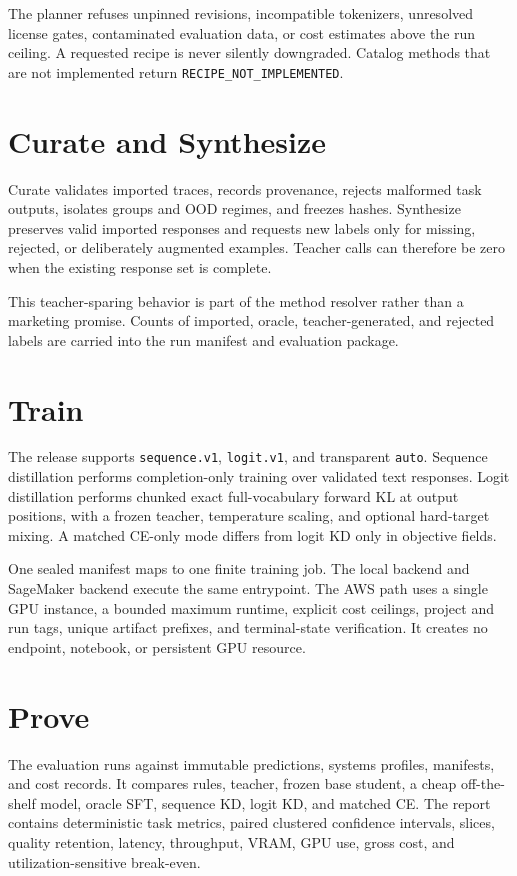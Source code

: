 \documentclass{article}
\begin{document}
The planner refuses unpinned revisions, incompatible tokenizers, unresolved license gates, contaminated evaluation data, or cost estimates above the run ceiling. A requested recipe is never silently downgraded. Catalog methods that are not implemented return \texttt{RECIPE\_NOT\_IMPLEMENTED}.

\section{Curate and Synthesize}
Curate validates imported traces, records provenance, rejects malformed task outputs, isolates groups and OOD regimes, and freezes hashes. Synthesize preserves valid imported responses and requests new labels only for missing, rejected, or deliberately augmented examples. Teacher calls can therefore be zero when the existing response set is complete.

This teacher-sparing behavior is part of the method resolver rather than a marketing promise. Counts of imported, oracle, teacher-generated, and rejected labels are carried into the run manifest and evaluation package.

\section{Train}
The release supports \texttt{sequence.v1}, \texttt{logit.v1}, and transparent \texttt{auto}. Sequence distillation performs completion-only training over validated text responses. Logit distillation performs chunked exact full-vocabulary forward KL at output positions, with a frozen teacher, temperature scaling, and optional hard-target mixing. A matched CE-only mode differs from logit KD only in objective fields.

One sealed manifest maps to one finite training job. The local backend and SageMaker backend execute the same entrypoint. The AWS path uses a single GPU instance, a bounded maximum runtime, explicit cost ceilings, project and run tags, unique artifact prefixes, and terminal-state verification. It creates no endpoint, notebook, or persistent GPU resource.

\section{Prove}
The evaluation runs against immutable predictions, systems profiles, manifests, and cost records. It compares rules, teacher, frozen base student, a cheap off-the-shelf model, oracle SFT, sequence KD, logit KD, and matched CE. The report contains deterministic task metrics, paired clustered confidence intervals, slices, quality retention, latency, throughput, VRAM, GPU use, gross cost, and utilization-sensitive break-even.
\end{document}

